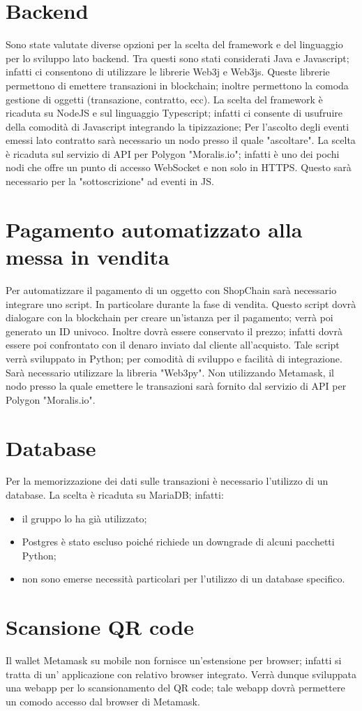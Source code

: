 \documentclass[a4paper, 12pt]{article}
\begin{document}
\section*{Backend}
Sono state valutate diverse opzioni per la scelta del framework e del linguaggio per lo sviluppo lato backend. Tra questi sono stati considerati Java e Javascript; infatti ci consentono di utilizzare le librerie Web3j e Web3js. Queste librerie permettono di emettere transazioni in blockchain; inoltre permettono la comoda gestione di oggetti (transazione, contratto, ecc).
La scelta del framework è ricaduta su NodeJS e sul linguaggio Typescript; infatti ci consente di usufruire della comodità di Javascript integrando la tipizzazione; Per l'ascolto degli eventi emessi lato contratto sarà necessario un nodo presso il quale "ascoltare". La scelta è ricaduta sul servizio di API per Polygon "Moralis.io"; infatti è uno dei pochi nodi che offre un punto di accesso WebSocket e non solo in HTTPS. Questo sarà necessario per la "sottoscrizione" ad eventi in JS.

\section*{Pagamento automatizzato alla messa in vendita}
Per automatizzare il pagamento di un oggetto con ShopChain sarà necessario integrare uno script. In particolare durante la fase di vendita. Questo script dovrà dialogare con la blockchain per creare un'istanza per il pagamento; verrà poi generato un ID univoco. Inoltre dovrà essere conservato il prezzo; infatti dovrà essere poi confrontato con il denaro inviato dal cliente all'acquisto.
Tale script verrà sviluppato in Python; per comodità di sviluppo e facilità di integrazione. Sarà necessario utilizzare la libreria "Web3py". Non utilizzando Metamask, il nodo presso la quale emettere le transazioni sarà fornito dal servizio di API per Polygon "Moralis.io".

\section*{Database}
Per la memorizzazione dei dati sulle transazioni è necessario l'utilizzo di un database. La scelta è ricaduta su MariaDB; infatti:
\begin{itemize}
\item il gruppo lo ha già utilizzato;
\item Postgres è stato escluso poiché richiede un downgrade di alcuni pacchetti Python;
\item non sono emerse necessità particolari per l'utilizzo di un database specifico.
\end{itemize}

\section*{Scansione QR code}
Il wallet Metamask su mobile non fornisce un'estensione per browser; infatti si tratta di un' applicazione con relativo browser integrato. Verrà dunque sviluppata una webapp per lo scansionamento del QR code; tale webapp dovrà permettere un comodo accesso dal browser di Metamask.
\end{document}
